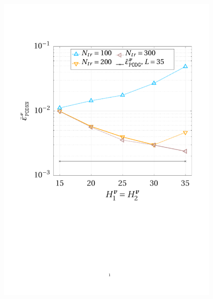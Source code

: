 \documentclass[longtitle]{elsarticle}
\numberwithin{equation}{section}
\theoremstyle{theorem}
\theoremstyle{definition}
\theoremstyle{remark}
\theoremstyle{proposition}
\numberwithin{figure}{section}
\begin{document}
		\begin{figure}[h!]
			\center
			\includegraphics[scale = 0.37, trim = {1cm 9cm 1.5cm 3.5cm}, clip]{dc_200_vel_nn_convergence}
			\hspace*{1cm}

\end{figure}
\end{document}
